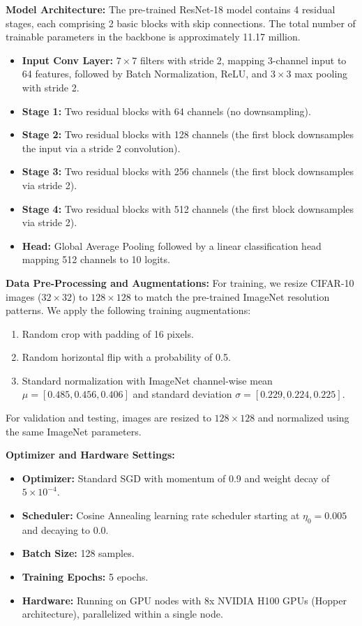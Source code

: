 \documentclass{article}
\theoremstyle{plain}
\theoremstyle{definition}
\theoremstyle{remark}
\begin{document}
\textbf{Model Architecture:}
The pre-trained ResNet-18 model contains 4 residual stages, each comprising 2 basic blocks with skip connections. The total number of trainable parameters in the backbone is approximately 11.17 million.
\begin{itemize}\setlength{\itemsep}{0pt}\setlength{\parskip}{0pt}\setlength{\parsep}{0pt}
    \item \textbf{Input Conv Layer:} $7 \times 7$ filters with stride 2, mapping 3-channel input to 64 features, followed by Batch Normalization, ReLU, and $3 \times 3$ max pooling with stride 2.
    \item \textbf{Stage 1:} Two residual blocks with 64 channels (no downsampling).
    \item \textbf{Stage 2:} Two residual blocks with 128 channels (the first block downsamples the input via a stride 2 convolution).
    \item \textbf{Stage 3:} Two residual blocks with 256 channels (the first block downsamples via stride 2).
    \item \textbf{Stage 4:} Two residual blocks with 512 channels (the first block downsamples via stride 2).
    \item \textbf{Head:} Global Average Pooling followed by a linear classification head mapping 512 channels to 10 logits.
\end{itemize}

\textbf{Data Pre-Processing and Augmentations:}
For training, we resize CIFAR-10 images ($32 \times 32$) to $128 \times 128$ to match the pre-trained ImageNet resolution patterns. We apply the following training augmentations:
\begin{enumerate}\setlength{\itemsep}{0pt}\setlength{\parskip}{0pt}\setlength{\parsep}{0pt}
    \item Random crop with padding of 16 pixels.
    \item Random horizontal flip with a probability of 0.5.
    \item Standard normalization with ImageNet channel-wise mean $\mu = [0.485, 0.456, 0.406]$ and standard deviation $\sigma = [0.229, 0.224, 0.225]$.
\end{enumerate}
For validation and testing, images are resized to $128 \times 128$ and normalized using the same ImageNet parameters.

\textbf{Optimizer and Hardware Settings:}
\begin{itemize}\setlength{\itemsep}{0pt}\setlength{\parskip}{0pt}\setlength{\parsep}{0pt}
    \item \textbf{Optimizer:} Standard SGD with momentum of 0.9 and weight decay of $5 \times 10^{-4}$.
    \item \textbf{Scheduler:} Cosine Annealing learning rate scheduler starting at $\eta_0 = 0.005$ and decaying to $0.0$.
    \item \textbf{Batch Size:} 128 samples.
    \item \textbf{Training Epochs:} 5 epochs.
    \item \textbf{Hardware:} Running on GPU nodes with 8x NVIDIA H100 GPUs (Hopper architecture), parallelized within a single node.
\end{itemize}
\end{document}

